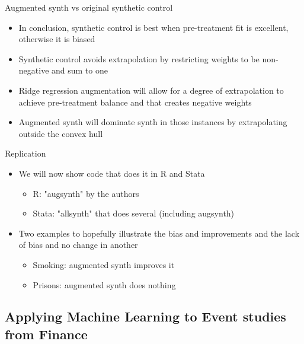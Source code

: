 \documentclass{beamer}
\begin{document}
\begin{frame}{Augmented synth vs original synthetic control}

\begin{itemize}
\item In conclusion, synthetic control is best when pre-treatment fit is excellent, otherwise it is biased
\item Synthetic control avoids extrapolation by restricting weights to be non-negative and sum to one
\item Ridge regression augmentation will allow for a degree of extrapolation to achieve pre-treatment balance and that creates negative weights
\item Augmented synth will dominate synth in those instances by extrapolating outside the convex hull
\end{itemize}

\end{frame}





\begin{frame}{Replication}

\begin{itemize}
\item We will now show code that does it in R and Stata
	\begin{itemize}
	\item R: "augsynth" by the authors
	\item Stata: "allsynth" that does several (including augsynth)
	\end{itemize}
\item Two examples to hopefully illustrate the bias and improvements and the lack of bias and no change in another
	\begin{itemize}
	\item Smoking: augmented synth improves it
	\item Prisons: augmented synth does nothing
	\end{itemize}
\end{itemize}

\end{frame}

\subsection{Applying Machine Learning to Event studies from Finance}
\end{document}
